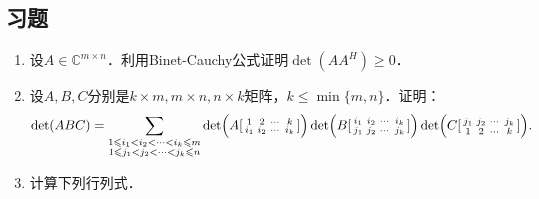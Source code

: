 \documentclass[a4paper,fontset=windows]{ctexbook}
\theoremstyle{definition}
\renewcommand{\le}{\leqslant}
\renewcommand{\ge}{\geqslant}
\begin{document}
\subsection*{习题}

\begin{enumerate}

\item 设$A\in\mathbb{C}^{m\times n}$．利用Binet-Cauchy公式证明$\det(AA^H)\ge 0$．

\item 设$A,B,C$分别是$k\times m,m\times n,n\times k$矩阵，$k\le\min\{m,n\}$．证明：
$$\det(ABC)=\sum_{\substack{1\le i_1<i_2<\cdots<i_k\le m \\ 1\le j_1<j_2<\cdots<j_k\le n}}\det\Bigl(A[\begin{smallmatrix}1&2&\cdots&k \\ i_1&i_2&\cdots&i_k\end{smallmatrix}]\Bigr)\det\Bigl(B[\begin{smallmatrix}i_1&i_2&\cdots&i_k \\ j_1&j_2&\cdots&j_k\end{smallmatrix}]\Bigr)\det\Bigl(C[\begin{smallmatrix}j_1&j_2&\cdots&j_k \\ 1&2&\cdots&k\end{smallmatrix}]\Bigr).$$

\item 计算下列行列式．


\end{enumerate}
\end{document}

